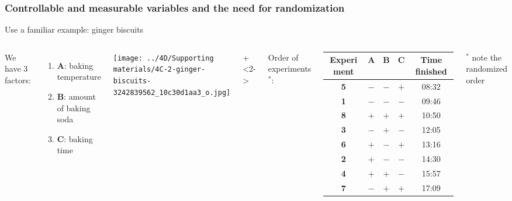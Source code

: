 \begin{frame}\frametitle{Controllable and measurable variables and the need for randomization}
	Use a familiar example: {\color{myOrange} ginger biscuits}
	\vspace{0.25cm}
	\begin{columns}[T]
			We have 3 factors:
			\begin{enumerate}
				\item	\textbf{A}: baking temperature
				\item	\textbf{B}: amount of baking soda
				\item	\textbf{C}: baking time
			\end{enumerate}
			
			
			\vspace{1cm}
			
			\texttt{[image: ../4D/Supporting materials/4C-2-ginger-biscuits-3242839562\_10c30d1aa3\_o.jpg]}
		
		
			
		
		
			\onslide+<2->{
			
				Order of experiments$^\ast$:
			
				\begin{tabulary}{\linewidth}{ccccc}\hline 
					\textbf{\relax Experiment } & \textbf{\relax A } & \textbf{\relax B } & \textbf{\relax C } & \textbf{\relax Time finished} \\
					\hline 
					\textbf{5} & \(-\) & \(-\) & \(+\) & 08:32\\
					\textbf{1} & \(-\) & \(-\) & \(-\) & 09:46\\
					\textbf{8} & \(+\) & \(+\) & \(+\) & 10:50\\
					\textbf{3} & \(-\) & \(+\) & \(-\) & 12:05\\
					\textbf{6} & \(+\) & \(-\) & \(+\) & 13:16\\
					\textbf{2} & \(+\) & \(-\) & \(-\) & 14:30\\
					\textbf{4} & \(+\) & \(+\) & \(-\) & 15:57\\
					\textbf{7} & \(-\) & \(+\) & \(+\) & 17:09\\
					
					 \hline
				\end{tabulary}
				
				\vspace{0.2cm}
				{\scriptsize $^\ast$ note the randomized order}
			}
			
			\vspace{0.75cm}
	\end{columns}	
\end{frame}

